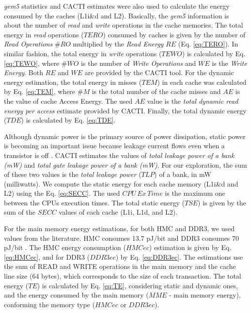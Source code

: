 \documentclass{sig-alternate-05-2015}
\begin{document}
{\emph{gem5}}{{} statistics and CACTI
estimates were also used to calculate the energy consumed by the caches
(L1i\&d and L2). Basically, the }{\emph{gem5}}{{}
information is about the number of }{\emph{read}}{{}
and }{\emph{write}}{{} operations
in the cache memories. The total energy in }{\emph{read}}{{}
operations ($TERO$) consumed by caches is given by the number of
}{\emph{Read Operations}}{{} $\#RO$
multiplied by the }{\emph{Read Energy}}{{}
$RE$ (Eq. \ref{eq:TERO}). In similar fashion, the total energy in
}{\emph{write}}{{} operations ($TEWO$)
is calculated by Eq. \ref{eq:TEWO}, where $\#WO$ is the number of
}{\emph{Write Operations}}{{} and
$WE$ is the }{\emph{Write Energy}}{.
Both $RE$ and $WE$ are provided by the CACTI tool. For the dynamic
energy estimation, the total energy in misses ($TEM$) in each cache
was calculated by Eq. \ref{eq:TEM}, where $\#M$ is the total number
of the cache misses and $AE$ is the value of cache Access Energy.
The used $AE$ value is the }{\emph{total dynamic
read energy per access}}{{} estimate provided by CACTI.
Finally, the total dynamic energy ($TDE$) is calculated by Eq. \ref{eq:TDE}.}

Although dynamic power is the primary source of
power dissipation, static power is becoming an important issue because
leakage current flows even when a transistor is off \cite{hennessypatterson:2012}.
CACTI estimates the values of \emph{total leakage
power of a bank (mW)} and \emph{total
gate leakage power of a bank (mW)}. For our exploration,
the sum of these two values is the {\emph{total
leakage power}}{{} ($TLP$) of a bank, in mW (milliwatts).
We compute the static energy for each cache memory (L1i\&d and L2)
using the Eq. \ref{eq:SECC}. The used $CPU\,Ex\,Time$ is the maximum
one between the CPUs execution times. The total static energy ($TSE$)
is given by the sum of the $SECC$ values of each cache (L1i, L1d,
and L2).}

{For the main memory energy estimations, for both
HMC and DDR3, we used values from the literature. HMC consumes 13.7
pJ/bit and DDR3 consumes 70 pJ/bit \cite{rosenfeld2014performance}.
The HMC energy consumption ($HMCec$) estimation is given by Eq. \ref{eq:HMCec},
and for DDR3 ($DDR3ec$) by Eq. \ref{eq:DDR3ec}. The estimations
use the sum of READ and WRITE operations in the main memory and the
cache line size (64 bytes), which corresponds to the size of each
transaction. The total energy ($TE$) is calculated by Eq. \ref{eq:TE},
considering static and dynamic ones, and the energy consumed by the
main memory ($MME$ - main memory energy), conforming the memory type
($HMCec$ or $DDR3ec$).}
\end{document}
